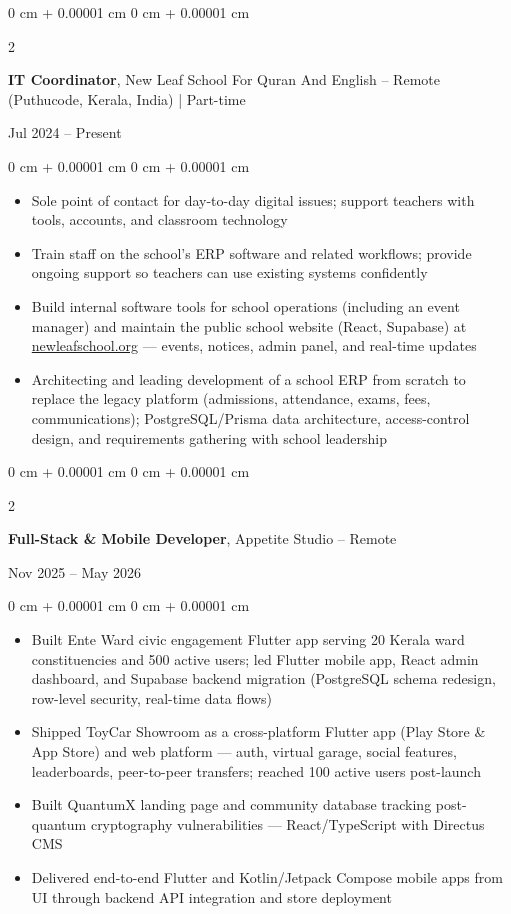 \documentclass[10pt, a4paper]{article}
\newenvironment{highlights}{
    \begin{itemize}[
        topsep=0.08 cm,
        parsep=0.06 cm,
        partopsep=0pt,
        itemsep=0pt,
        leftmargin=0 cm + 10pt
    ]
}{
    \end{itemize}
}
\newenvironment{onecolentry}{
    \begin{adjustwidth}{
        0 cm + 0.00001 cm
    }{
        0 cm + 0.00001 cm
    }
}{
    \end{adjustwidth}
}
\newenvironment{twocolentry}[2][]{
    \onecolentry
    \def\secondColumn{#2}
    \setcolumnwidth{\fill, 4.8 cm}
    \begin{paracol}{2}
}{
    \switchcolumn \raggedleft \secondColumn
    \end{paracol}
    \endonecolentry}
\let\hrefWithoutArrow\href
\begin{document}
    \begin{twocolentry}{
        Jul 2024 -- Present
    }
        \textbf{IT Coordinator}, New Leaf School For Quran And English -- Remote (Puthucode, Kerala, India) | Part-time
    \end{twocolentry}
    \vspace{0.08 cm}
    \begin{onecolentry}
        \begin{highlights}
            \item Sole point of contact for day-to-day digital issues; support teachers with tools, accounts, and classroom technology
            \item Train staff on the school's ERP software and related workflows; provide ongoing support so teachers can use existing systems confidently
            \item Build internal software tools for school operations (including an event manager) and maintain the public school website (React, Supabase) at \hrefWithoutArrow{https://newleafschool.org}{newleafschool.org} --- events, notices, admin panel, and real-time updates
            \item Architecting and leading development of a school ERP from scratch to replace the legacy platform (admissions, attendance, exams, fees, communications); PostgreSQL/Prisma data architecture, access-control design, and requirements gathering with school leadership
        \end{highlights}
    \end{onecolentry}

    \vspace{0.15 cm}

    \begin{twocolentry}{
        Nov 2025 -- May 2026
    }
        \textbf{Full-Stack \& Mobile Developer}, Appetite Studio -- Remote
    \end{twocolentry}
    \vspace{0.08 cm}
    \begin{onecolentry}
        \begin{highlights}
            \item Built Ente Ward civic engagement Flutter app serving 20 Kerala ward constituencies and 500 active users; led Flutter mobile app, React admin dashboard, and Supabase backend migration (PostgreSQL schema redesign, row-level security, real-time data flows)
            \item Shipped ToyCar Showroom as a cross-platform Flutter app (Play Store \& App Store) and web platform --- auth, virtual garage, social features, leaderboards, peer-to-peer transfers; reached 100 active users post-launch
            \item Built QuantumX landing page and community database tracking post-quantum cryptography vulnerabilities --- React/TypeScript with Directus CMS
            \item Delivered end-to-end Flutter and Kotlin/Jetpack Compose mobile apps from UI through backend API integration and store deployment
        \end{highlights}
    \end{onecolentry}
\end{document}
